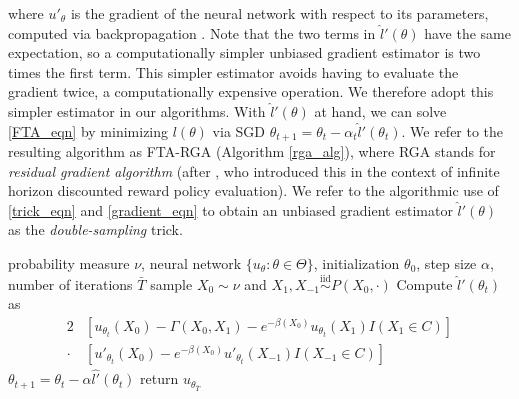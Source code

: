 \documentclass[pdflatex,sn-mathphys-ay]{sn-jnl}%
\numberwithin{equation}{section}
\newcommand\sbk[1]{\left[#1\right]}
\theoremstyle{thmstyleone}%
\theoremstyle{thmstyletwo}%
\theoremstyle{thmstylethree}%
\begin{document}
where $u'_\theta$ is the gradient of the neural network with respect to its parameters, computed via backpropagation \citep{rumelhart1986learning}. Note that the two terms in $\hat{l}'(\theta)$ have the same expectation, so a computationally simpler unbiased gradient estimator is two times the first term. This simpler estimator avoids having to evaluate the gradient twice, a computationally expensive operation. We therefore adopt this simpler estimator in our algorithms. With $\hat{l}'(\theta)$ at hand, we can solve \eqref{FTA_eqn} by minimizing $l(\theta)$ via SGD $\theta_{t+1}=\theta_t-\alpha_t\hat{l}'(\theta_t)$. 
We refer to the resulting algorithm as FTA-RGA (Algorithm \ref{rga_alg}), where RGA stands for {\it residual gradient algorithm} (after \cite{baird1995residual}, who introduced this in the context of infinite horizon discounted reward policy evaluation). We refer to the algorithmic use of \eqref{trick_eqn} and \eqref{gradient_eqn} to obtain an unbiased gradient estimator $\hat{l}'(\theta)$ as the {\it double-sampling} trick.
\begin{algorithm}
\caption{FTA-RGA}\label{rga_alg}
\begin{algorithmic}
\Require probability measure $\nu$, neural network $\{u_\theta:\theta\in\Theta\}$, initialization $\theta_0$, step size $\alpha$, number of iterations $\bar{T}$
\State sample $X_0\sim\nu$ and $X_1,X_{-1}\stackrel{\text{iid}}{\sim}P(X_0,\cdot)$
\State Compute $\hat{l}'(\theta_t)$ as
\begin{align*}
    2&\sbk{u_{\theta_t}(X_0)-\Gamma(X_0,X_1)-e^{-\beta(X_0)}u_{\theta_t}(X_1)I(X_1\in C)}\\
    \cdot&\sbk{u'_{\theta_t}(X_0)-e^{-\beta(X_0)}u'_{\theta_t}(X_{-1})I(X_{-1}\in C)}
\end{align*}
\State $\theta_{t+1}=\theta_t-\alpha\hat{l'}(\theta_t)$
\EndFor
\State return $u_{\theta_{\bar{T}}}$
\end{algorithmic}
\end{algorithm}
\end{document}
